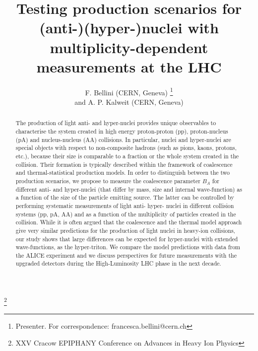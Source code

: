 \documentclass{appolb}
\begin{document}
\title{Testing production scenarios for (anti-)(hyper-)nuclei with multiplicity-dependent measurements at the LHC}
\author{F. Bellini (CERN, Geneva) \footnote{Presenter. For correspondence: francesca.bellini@cern.ch} 
	    \\and A. P. Kalweit (CERN, Geneva)}
\thanks{XXV Cracow EPIPHANY Conference on Advances in Heavy Ion Physics}%
\address{}
\maketitle
\begin{abstract}
The production of light anti- and hyper-nuclei provides unique observables to characterise the system created in high energy proton-proton (pp), proton-nucleus (pA) and nucleus-nucleus (AA) collisions. In particular, nuclei and hyper-nuclei are special objects with respect to non-composite hadrons (such as pions, kaons, protons, etc.), because their size is comparable to a fraction or the whole system created in the collision. Their formation is typically described within the framework of coalescence and thermal-statistical production models. 
In order to distinguish between the two production scenarios, we propose to measure the coalescence parameter $B_A$ for different anti- and hyper-nuclei (that differ by mass, size and internal wave-function) as a function of the size of the particle emitting source. 
The latter can be controlled by performing systematic measurements of light anti- hyper- nuclei in different collision systems (pp, pA, AA) and as a function of the multiplicity of particles created in the collision. 
While it is often argued that the coalescence and the thermal model approach give very similar predictions for the production of light nuclei in heavy-ion collisions, our study shows that large differences can be expected for hyper-nuclei with extended wave-functions, as the hyper-triton. We compare the model predictions with data from the ALICE experiment and we discuss perspectives for future measurements with the upgraded detectors during the High-Luminosity LHC phase in the next decade. 
\end{abstract}

  
\end{document}
